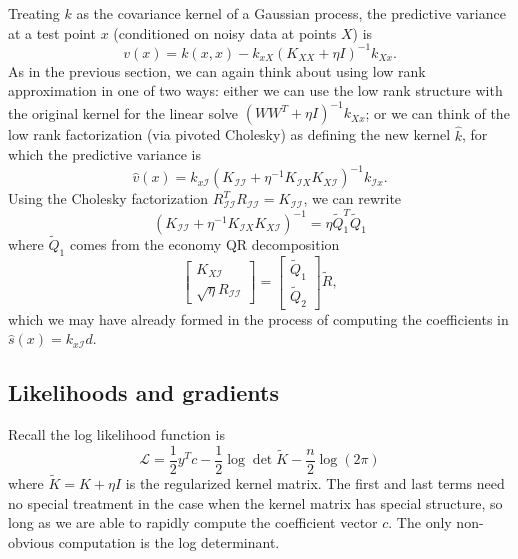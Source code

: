 \documentclass[12pt, leqno]{article} %
\newcommand{\calI}{\mathcal{I}}
\begin{document}
Treating $k$ as the covariance kernel of a Gaussian process,
the predictive variance at a test point $x$
(conditioned on noisy data at points $X$) is
\[
  v(x) = k(x,x) - k_{xX} (K_{XX} + \eta I)^{-1} k_{Xx}.
\]
As in the previous section, we can again think about using low rank
approximation in one of two ways: either we can use the low rank
structure with the original kernel for the linear solve
$(WW^T + \eta I)^{-1} k_{Xx}$; or we can think of the low rank
factorization (via pivoted Cholesky) as defining the new kernel $\hat{k}$,
for which the predictive variance is
\[
  \hat{v}(x) =
    k_{x \calI} (K_{\calI \calI} + \eta^{-1} K_{\calI X} K_{X \calI})^{-1} k_{\calI x}.
\]
Using the Cholesky factorization
$R_{\calI \calI}^T R_{\calI \calI} = K_{\calI \calI}$, we can rewrite
\[
  (K_{\calI \calI} + \eta^{-1} K_{\calI X} K_{X \calI})^{-1} = 
  \eta \tilde{Q}_1^T \tilde{Q}_1
\]
where $\tilde{Q}_1$ comes from the economy QR decomposition
\[
  \begin{bmatrix} K_{X \calI} \\ \sqrt{\eta} R_{\calI \calI} \end{bmatrix} =
  \begin{bmatrix} \tilde{Q}_1 \\ \tilde{Q}_2 \end{bmatrix}
  \tilde{R},
\]
which we may have already formed in the process of computing the
coefficients in $\hat{s}(x) = k_{x \calI} d$.


\subsection{Likelihoods and gradients}

Recall the log likelihood function is
\[
  \mathcal{L} =
  \frac{1}{2} y^T c - \frac{1}{2} \log \det \tilde{K} - \frac{n}{2} \log(2\pi)
\]
where $\tilde{K} = K + \eta I$ is the regularized kernel matrix.
The first and last terms need no special treatment in the case when
the kernel matrix has special structure, so long as we are able to
rapidly compute the coefficient vector $c$.  The only non-obvious
computation is the log determinant.
\end{document}
